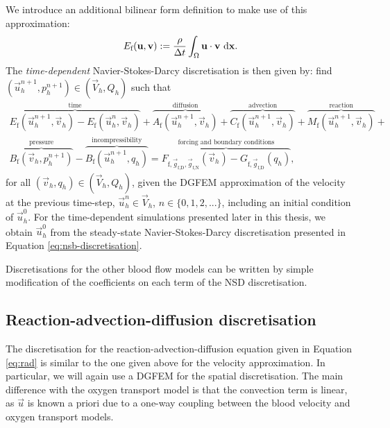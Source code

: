             We introduce an additional bilinear form definition to make use of this approximation:
            \begin{equation}
                E_\text{f}(\boldsymbol{\mathbf{u}}, \boldsymbol{\mathbf{v}}) := \frac{\rho}{\Delta t} \int_\Omega \boldsymbol{\mathbf{u}} \cdot \boldsymbol{\mathbf{v}} ~\mathrm{d} \boldsymbol{\mathbf{x}}.
                \label{eq:nsb-wf-time-euler}
            \end{equation}
            The \textit{time-dependent} Navier-Stokes-Darcy discretisation is then given by: find $(\vec{u}^{n+1}_h, p^{n+1}_h) \in (\vec{V}_h, Q_h)$ such that
            \begin{multline}
                \overbrace{E_\text{f}(\vec{u}^{n+1}_h, \vec{v}_h) - E_\text{f}(\vec{u}^n_h, \vec{v}_h)}^{\text{time}} + \overbrace{A_\text{f}(\vec{u}^{n+1}_h, \vec{v}_h)}^{\text{diffusion}} + \overbrace{C_\text{f}(\vec{u}^{n+1}_h, \vec{v}_h)}^{\text{advection}} + \overbrace{M_\text{f}(\vec{u}^{n+1}_h, \vec{v}_h)}^{\text{reaction}} + \\ \overbrace{B_\text{f}(\vec{v}_h, p^{n+1}_h)}^{\text{pressure}} - \overbrace{B_\text{f}(\vec{u}^{n+1}_h, q_h)}^{\text{incompressibility}} = \overbrace{F_{\text{f},\vec{g}_\text{f,D},\vec{g}_\text{f,N}}(\vec{v}_h) - G_{\text{f},\vec{g}_\text{f,D}}(q_h)}^{\text{forcing and boundary conditions}},
                \label{eq:nsb-discretisation-time}
            \end{multline}
            for all $(\vec{v}_h, q_h) \in (\vec{V}_h, Q_h)$, given the DGFEM approximation of the velocity at the previous time-step, $\vec{u}^n_h \in \vec{V}_h$, $n \in \{0, 1, 2, ...\}$, including an initial condition of $\vec{u}^0_h$. For the time-dependent simulations presented later in this thesis, we obtain $\vec{u}^0_h$ from the steady-state Navier-Stokes-Darcy discretisation presented in Equation \eqref{eq:nsb-discretisation}.

            Discretisations for the other blood flow models can be written by simple modification of the coefficients on each term of the NSD discretisation.

        \subsection{Reaction-advection-diffusion discretisation} \label{sec:numerical-methods:equation-discretisations:rad}
            The discretisation for the reaction-advection-diffusion equation given in Equation \eqref{eq:rad} is similar to the one given above for the velocity approximation. In particular, we will again use a DGFEM for the spatial discretisation. The main difference with the oxygen transport model is that the convection term is linear, as $\vec{u}$ is known a priori due to a one-way coupling between the blood velocity and oxygen transport models.

